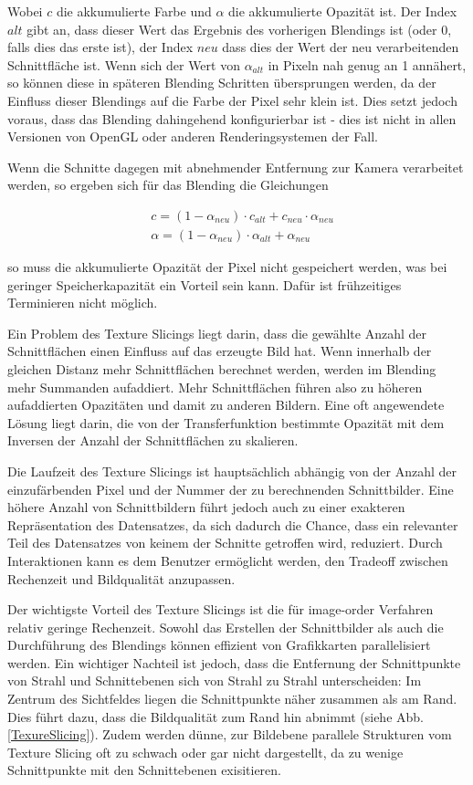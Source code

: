 \documentclass[a4paper,fontsize=12pt,toc=bib,halfparskip]{scrartcl}
\begin{document}
Wobei $c$ die akkumulierte Farbe und $\alpha$ die akkumulierte Opazit\"at ist. Der Index $alt$ gibt an, dass dieser Wert das Ergebnis des vorherigen Blendings ist (oder 0, falls dies das erste ist), der Index $neu$ dass dies der Wert der neu verarbeitenden Schnittfl\"ache ist. Wenn sich der Wert von $\alpha_{alt}$ in Pixeln nah genug an 1 ann\"ahert, so k\"onnen diese in sp\"ateren Blending Schritten \"ubersprungen werden, da der Einfluss dieser Blendings auf die Farbe der Pixel sehr klein ist. Dies setzt jedoch voraus, dass das Blending dahingehend konfigurierbar ist - dies ist nicht in allen Versionen von OpenGL oder anderen Renderingsystemen der Fall. 

Wenn die Schnitte dagegen mit abnehmender Entfernung zur Kamera verarbeitet werden, so ergeben sich f\"ur das Blending die Gleichungen

\begin{align}
&c = (1-\alpha_{neu})\cdot c_{alt}+c_{neu}\cdot\alpha_{neu}
\label{back-to-front-color}\\ 
&\alpha = (1-\alpha_{neu})\cdot\alpha_{alt} + \alpha_{neu}
\label{back-to-front-alpha}
\end{align}

so muss die akkumulierte Opazit\"at der Pixel nicht gespeichert werden, was bei geringer Speicherkapazit\"at ein Vorteil sein kann. Daf\"ur ist fr\"uhzeitiges Terminieren nicht m\"oglich.

Ein Problem des Texture Slicings liegt darin, dass die gew\"ahlte Anzahl der Schnittfl\"achen einen Einfluss auf das erzeugte Bild hat. Wenn innerhalb der gleichen Distanz mehr Schnittfl\"achen berechnet werden, werden im Blending mehr Summanden aufaddiert. Mehr Schnittfl\"achen f\"uhren also zu h\"oheren aufaddierten Opazit\"aten und damit zu anderen Bildern. Eine oft angewendete L\"osung liegt darin, die von der Transferfunktion bestimmte Opazit\"at mit dem Inversen der Anzahl der Schnittfl\"achen zu skalieren.

Die Laufzeit des Texture Slicings ist haupts\"achlich abh\"angig von der Anzahl der einzuf\"arbenden Pixel und der Nummer der zu berechnenden Schnittbilder. Eine h\"ohere Anzahl von Schnittbildern f\"uhrt jedoch auch zu einer exakteren Repr\"asentation des Datensatzes, da sich dadurch die Chance, dass ein relevanter Teil des Datensatzes von keinem der Schnitte getroffen wird, reduziert. Durch Interaktionen kann es dem Benutzer erm\"oglicht werden, den Tradeoff zwischen Rechenzeit und Bildqualit\"at anzupassen.

Der wichtigste Vorteil des Texture Slicings ist die f\"ur image-order Verfahren relativ geringe Rechenzeit. Sowohl das Erstellen der Schnittbilder als auch die Durchf\"uhrung des Blendings k\"onnen effizient von Grafikkarten parallelisiert werden. Ein wichtiger Nachteil ist jedoch, dass die Entfernung der Schnittpunkte von Strahl und Schnittebenen sich von Strahl zu Strahl unterscheiden: Im Zentrum des Sichtfeldes liegen die Schnittpunkte n\"aher zusammen als am Rand. Dies f\"uhrt dazu, dass die Bildqualit\"at zum Rand hin abnimmt (siehe Abb. \ref{TexureSlicing}). Zudem werden d\"unne, zur Bildebene parallele Strukturen vom Texture Slicing oft zu schwach oder gar nicht dargestellt, da zu wenige Schnittpunkte mit den Schnittebenen exisitieren.
\end{document}
